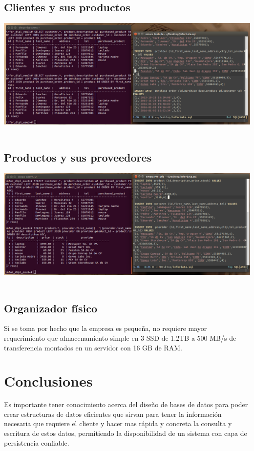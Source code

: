 \documentclass[spanish,12pt,letterpapper]{article}
\begin{document}
	\subsection{Clientes y sus productos}
	\begin{center}
	\includegraphics[width=1\textwidth]{./customerproducts}~\\[1cm] 
	\end{center}	
	
	\subsection{Productos y sus proveedores}
	\begin{center}
	\includegraphics[width=1\textwidth]{./productproviders}~\\[1cm] 
	\end{center}	
	
	\subsection{Organizador físico}
	Si se toma por hecho que la empresa es pequeña, no requiere mayor requerimiento que almacenamiento simple en 3 SSD de 1.2TB a 500 MB/s de transferencia montados en un servidor con 16 GB de RAM.  
	
	\section{Conclusiones}
	Es importante tener conocimiento acerca del diseño de bases de datos para poder crear estructuras de datos eficientes que sirvan para tener la información necesaria que requiere el cliente y hacer mas rápida y concreta la consulta y escritura de estos datos, permitiendo la disponibilidad de un sistema con capa de persistencia confiable.
	
\end{document}
